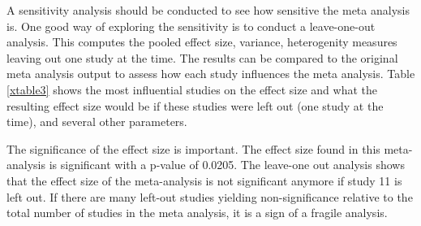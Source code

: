 \documentclass[11pt, a4paper]{article}
\begin{document}
  

A sensitivity analysis should be conducted to see how sensitive the meta analysis is. One good way of exploring the sensitivity is to conduct a leave-one-out analysis. This computes the pooled effect size, variance, heterogenity measures leaving out one study at the time. The results can be compared to the original meta analysis output to assess how each study influences the meta analysis. Table \ref{xtable3} shows the most influential studies on the effect size and what the resulting effect size would be if these studies were left out (one study at the time), and several other parameters.

\begin{table}[ht]
\centering
\caption{Output of the sensitivity analysis (leave1out analysis) with the results of the meta analysis, leaving out 1 study at a time. The top most influential studies, in relation to effect size, sorted by absolute change in effect size is shown. The Left-out study indicates which study is left out to produce the results. ES = Effect size, SE = Standard error, CI =  95 percent confidence interval, P(ES) = p-value of estimate, Q = Test for residual heterogeneity, P(Q) = p-value of heterogenity value, $I^2$ = residual heterogeneity.} 
\label{xtable3}
{\footnotesize
{}
}
\end{table}


\noindent 
The significance of the effect size is important. The effect size found in this meta-analysis is significant with a p-value of 0.0205. The leave-one out analysis shows that the effect size of the meta-analysis is not significant anymore if study 11 is left out. If there are many left-out studies yielding non-significance relative to the total number of studies in the meta analysis, it is a sign of a fragile analysis.
\end{document}
